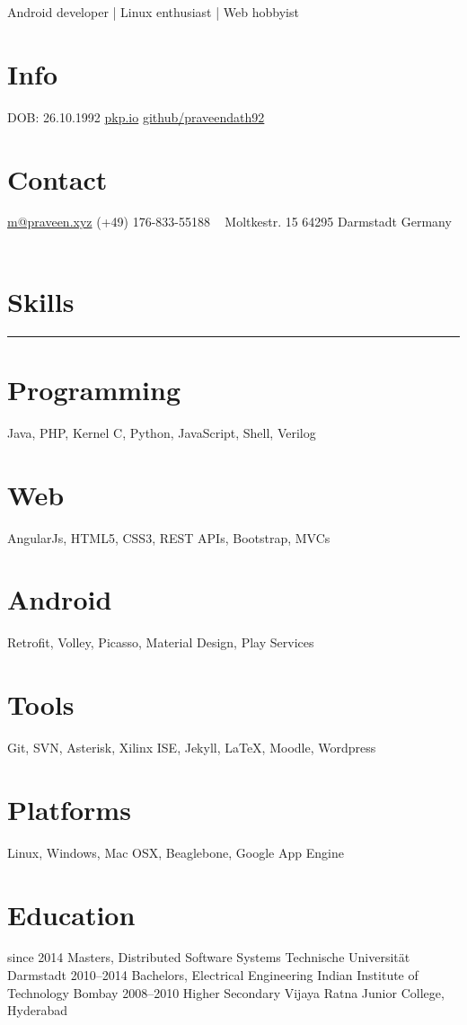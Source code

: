 \documentclass[]{friggeri-cv}
\begin{document}
       {Android developer | Linux enthusiast | Web hobbyist}

\begin{aside}
  \section{Info}
    DOB: 26.10.1992
    \href{http://pkp.io}{pkp.io}
    \href{http://github.com/praveendath92}{github/praveendath92}
  \section{Contact}
    \href{mailto:m@praveen.xyz}{m@praveen.xyz}
    (+49) 176-833-55188
    ~
    Moltkestr. 15
    64295 Darmstadt
    Germany
    ~
  \section{Skills}
    \noindent\rule{3cm}{0.5pt}
  \section{Programming}
    Java, PHP, Kernel C, Python, JavaScript, Shell, Verilog
  \section{Web}
    AngularJs, HTML5, CSS3, REST APIs, Bootstrap, MVCs
  \section{Android}
    Retrofit, Volley, Picasso, Material Design, Play Services
  \section{Tools}
    Git, SVN, Asterisk, Xilinx ISE, Jekyll, \LaTeX, Moodle, Wordpress
  \section{Platforms}
    Linux, Windows, Mac OSX, Beaglebone, Google App Engine
\end{aside}


\section{Education}

\begin{entrylist}
  \entry
    {since 2014}
    {Masters, {\normalfont Distributed Software Systems}}
    {Technische Universität Darmstadt}
    {}%
  \entry
    {2010–2014}
    {Bachelors, {\normalfont Electrical Engineering}}
    {Indian Institute of Technology Bombay}
    {}%
  \entry
    {2008–2010}
    {Higher Secondary}
    {Vijaya Ratna Junior College, Hyderabad}
    {}%
\end{entrylist}
\end{document}
